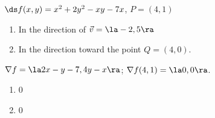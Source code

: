 {$\ds f(x,y) = x^2+2y^2-xy-7x$, $P = (4,1)$
\begin{enumerate}
	\item In the direction of $\vec v = \la -2,5\ra$
	\item	In the direction toward the point $Q = (4,0)$.
\end{enumerate}
}
{$\nabla f = \la 2x-y-7,4y-x\ra$; $\nabla f(4,1) = \la 0,0\ra$.
\begin{enumerate}
	\item 0
	\item	0
\end{enumerate}
}